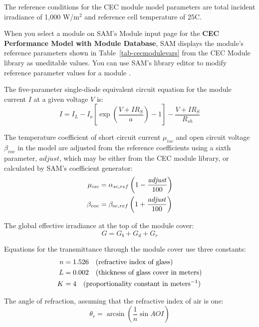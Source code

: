 \documentclass[12pt,letterpaper]{article}
\newcommand\AOI{\ensuremath{\mathit{AOI}}}
\begin{document}
The reference conditions for the CEC module model parameters are total incident irradiance of 1,000 W/m$^2$ and reference cell temperature of 25\degree C. 

When you select a module on SAM's Module input page for the \textbf{CEC Performance Model with Module Database}, SAM displays the module's reference parameters shown in Table~\ref{tab-cecmodulevars} from the CEC Module library as uneditable values. You can use SAM's library editor to modify reference parameter values for a module  \citep{help-libraries}.

The five-parameter single-diode equivalent circuit equation for the module current $I$ at a given voltage $V$ is:
\begin{equation}\label{eqn-cec5par}
I = I_L - I_o \left[ \exp\left(  \frac{V+IR_S}{a} \right) -1 \right] - \frac{V + IR_S}{R_{sh}}
\end{equation}

The temperature coefficient of short circuit current $\mu_{isc}$ and open circuit voltage $\beta_{voc}$ in the model are adjusted from the reference coefficients using a sixth parameter, $\mathit{adjust}$, which may be either from the CEC module library, or calculated by SAM's coefficient generator:
\begin{align}
\mu_{isc} & = \alpha_{sc,ref} \left( 1-\frac{\mathit{adjust}}{100}\right) \notag\\
\beta_{voc} & = \beta_{oc,ref} \left( 1+\frac{\mathit{adjust}}{100}\right) 
\end{align}

The global effective irradiance at the top of the module cover:
\begin{equation}
G = G_b + G_d + G_r
\end{equation}

Equations for the transmittance through the module cover use three constants:
\begin{align}\label{eqn-coverproperties}
n & = 1.526 \quad\text{(refractive index of glass)} \notag\\
L & = 0.002 \quad\text{(thickness of glass cover in meters)} \notag\\
K &= 4 \quad\text{(proportionality constant in meters$^{-1}$)}
\end{align}

The angle of refraction, assuming that the refractive index of air is one:
\begin{equation}
\theta_r = \arcsin\left(\frac{1}{n} \sin \AOI \right)
\end{equation}
\end{document}
